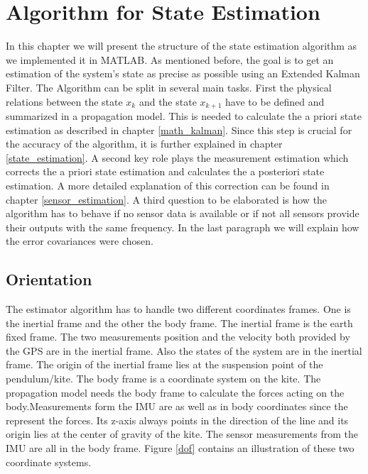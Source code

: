 \section{Algorithm for State Estimation}
In this chapter we will present the structure of the state estimation algorithm as we implemented it in MATLAB. As mentioned before, the goal is to get an estimation of the system's state as precise as possible using an Extended Kalman Filter. The Algorithm can be split in several main tasks. First the physical relations between the state $x_{k}$ and the state $x_{k+1}$ have to be defined and summarized in a propagation model. This is needed to calculate the a priori state estimation as described in chapter \ref{math_kalman}. Since this step is  crucial for the accuracy of the algorithm, it is further explained in chapter \ref{state_estimation}. A second key role plays the measurement estimation which corrects the a priori state estimation and calculates the a posteriori state estimation. A more detailed explanation of this correction can be found in chapter \ref{sensor_estimation}. A third question to be elaborated is how the algorithm has to behave if no sensor data is available or if not all sensors provide their outputs with the same frequency. In the last paragraph we will explain how the error covariances were chosen.

\subsection*{Orientation}
The estimator algorithm has to handle two different coordinates frames. One is the inertial frame and the other the body frame. The inertial frame is the earth fixed frame. The two measurements position and the velocity both provided by the GPS are in the inertial frame. Also the states of the system are in the inertial frame. The origin of the inertial frame lies at the suspension point of the pendulum/kite. The body frame is a coordinate system on the kite. The propagation model needs the body frame to calculate the forces acting on the body.Measurements form the IMU are as well as in body coordinates since the represent the forces. Its z-axis always points in the direction of the line and its origin lies at the center of gravity of the kite. The sensor measurements from the IMU are all in the body frame. Figure \ref{dof} contains an illustration of these two coordinate systems. 

